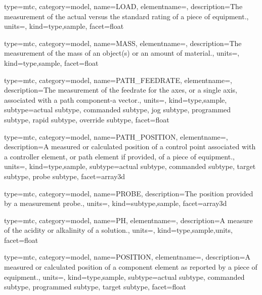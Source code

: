 {
  type=mtc,
  category=model,
  name={LOAD},
  elementname=,
  description={The measurement of the actual versus the standard rating of a piece of equipment.},
  units=,
  kind={type,sample},
  facet={\gls{float}}
}


{
  type=mtc,
  category=model,
  name={MASS},
  elementname=,
  description={The measurement of the mass of an object(s) or an amount of material.},
  units=,
  kind={type,sample},
  facet={\gls{float}}
}


{
  type=mtc,
  category=model,
  name={PATH\_FEEDRATE},
  elementname=,
  description={The measurement of the feedrate for the axes, or a single axis, associated with a \gls{path} component-a vector.},
  units=,
  kind={type,sample},
  subtype={\gls{actual subtype}, \gls{commanded subtype}, \gls{jog subtype}, \gls{programmed subtype}, \gls{rapid subtype}, \gls{override subtype}},
  facet={\gls{float}}
}





{
  type=mtc,
  category=model,
  name={PATH\_POSITION},
  elementname=,
  description={A measured or calculated position of a control point associated with a \gls{controller} element, or \gls{path} element if provided, of a piece of equipment.},
  units=,
  kind={type,sample},
  subtype={\gls{actual subtype}, \gls{commanded subtype}, \gls{target subtype}, \gls{probe subtype}},
  facet={\gls{array3d}}
}


{
  type=mtc,
  category=model,
  name={PROBE},
  description={The position provided by a measurement probe.},
  units=,
  kind={subtype,sample},
  facet={\gls{array3d}}
}


{
  type=mtc,
  category=model,
  name={PH},
  elementname=,
  description={A measure of the acidity or alkalinity of a solution.},
  units=,
  kind={type,sample,units},
  facet={\gls{float}}
}


{
  type=mtc,
  category=model,
  name={POSITION},
  elementname=,
  description={A measured or calculated position of a \gls{component} element as reported by a piece of equipment.},
  units=,
  kind={type,sample},
  subtype={\gls{actual subtype}, \gls{commanded subtype}, \gls{programmed subtype}, \gls{target subtype}},
  facet={\gls{float}}
}


